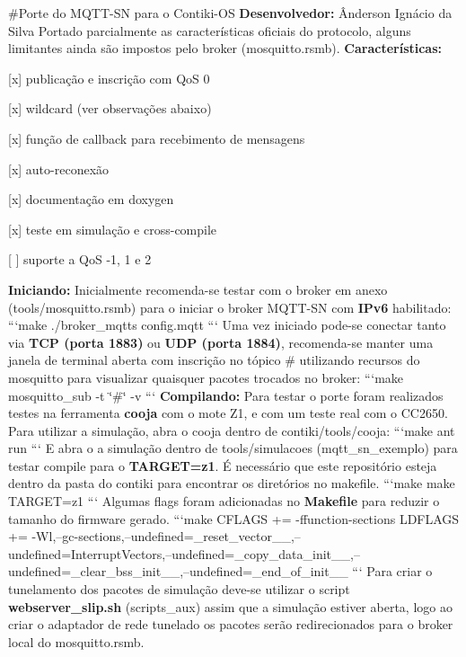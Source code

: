 \#\+Porte do M\+Q\+T\+T-\/\+S\+N para o Contiki-\/\+O\+S  {\bfseries Desenvolvedor\+:} Ânderson Ignácio da Silva  Portado parcialmente as características oficiais do protocolo, alguns limitantes ainda são impostos pelo broker (mosquitto.\+rsmb).  {\bfseries Características\+:}
\begin{DoxyItemize}
\item \mbox{[}x\mbox{]} publicação e inscrição com Qo\+S 0
\item \mbox{[}x\mbox{]} wildcard (ver observações abaixo)
\item \mbox{[}x\mbox{]} função de callback para recebimento de mensagens
\item \mbox{[}x\mbox{]} auto-\/reconexão
\item \mbox{[}x\mbox{]} documentação em doxygen
\item \mbox{[}x\mbox{]} teste em simulação e cross-\/compile
\item \mbox{[} \mbox{]} suporte a Qo\+S -\/1, 1 e 2 
\end{DoxyItemize}

{\bfseries Iniciando\+:}  Inicialmente recomenda-\/se testar com o broker em anexo (tools/mosquitto.\+rsmb) para o iniciar o broker M\+Q\+T\+T-\/\+S\+N com {\bfseries I\+Pv6} habilitado\+: ```make ./broker\+\_\+mqtts config.\+mqtt ``` Uma vez iniciado pode-\/se conectar tanto via {\bfseries T\+C\+P (porta 1883)} ou {\bfseries U\+D\+P (porta 1884)}, recomenda-\/se manter uma janela de terminal aberta com inscrição no tópico \# utilizando recursos do mosquitto para visualizar quaisquer pacotes trocados no broker\+: ```make mosquitto\+\_\+sub -\/t \char`\"{}\#\char`\"{} -\/v ``` {\bfseries Compilando\+:}  Para testar o porte foram realizados testes na ferramenta {\bfseries cooja} com o mote Z1, e com um teste real com o C\+C2650. Para utilizar a simulação, abra o cooja dentro de contiki/tools/cooja\+: ```make ant run ``` E abra o a simulação dentro de tools/simulacoes (mqtt\+\_\+sn\+\_\+exemplo) para testar compile para o {\bfseries T\+A\+R\+G\+E\+T=z1}. É necessário que este repositório esteja dentro da pasta do contiki para encontrar os diretórios no makefile. ```make make T\+A\+R\+G\+E\+T=z1 ``` Algumas flags foram adicionadas no {\bfseries Makefile} para reduzir o tamanho do firmware gerado. ```make C\+F\+L\+A\+G\+S += -\/ffunction-\/sections L\+D\+F\+L\+A\+G\+S += -\/\+Wl,--gc-\/sections,--undefined=\+\_\+reset\+\_\+vector\+\_\+\+\_\+,--undefined=Interrupt\+Vectors,--undefined=\+\_\+copy\+\_\+data\+\_\+init\+\_\+\+\_\+,--undefined=\+\_\+clear\+\_\+bss\+\_\+init\+\_\+\+\_\+,--undefined=\+\_\+end\+\_\+of\+\_\+init\+\_\+\+\_\+ ``` Para criar o tunelamento dos pacotes de simulação deve-\/se utilizar o script {\bfseries webserver\+\_\+slip.\+sh} (scripts\+\_\+aux) assim que a simulação estiver aberta, logo ao criar o adaptador de rede tunelado os pacotes serão redirecionados para o broker local do mosquitto.\+rsmb.  

